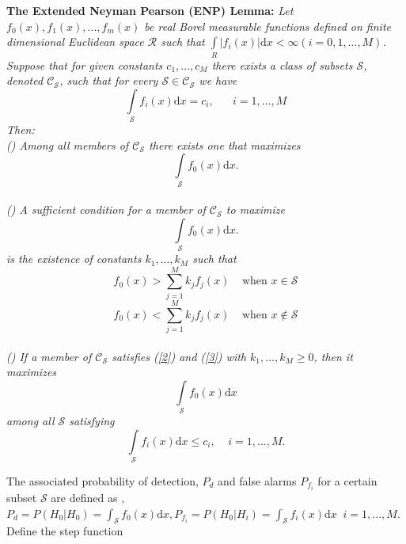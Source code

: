 \documentclass[12pt,journal,a4paper,twoside,onecolumn,draft]{IEEEtran}
\newcommand{\rmnum}[1]{\romannumeral #1}
\begin{document}
\begin{spacing}{2.5}
\noindent  \textbf{The Extended Neyman Pearson (ENP) Lemma:}
\textit{
Let $f_0(x), f_1(x), ..., f_{m}(x)$ be real Borel measurable functions  defined on finite dimensional  Euclidean space $\mathcal{R}$ such that $\int \limits_R | f_i(x)|\mathrm{d}x < \infty (i=0, 1,...,M)$.  Suppose that for given constants $c_1,...,c_M$ there exists a class of subsets $\mathcal{S}$, denoted $\mathcal{C}_\mathcal{S}$, such that for every $\mathcal{S} \in \mathcal{C}_\mathcal{S}$ we have
\begin{equation}
\label{one}
\int\limits_\mathcal{S} f_i(x)\mathrm{d}x = c_i, \;\;\;\;\;\;i=1,...,M
\end{equation}
Then:
\\\textnormal{(\rmnum{1})} Among all members of $\mathcal{C}_\mathcal{S}$ there exists one that maximizes
\[
\int \limits_\mathcal{S} f_{0}(x)\mathrm{d}x.
\]
\\\textnormal{(\rmnum{2})} A sufficient condition for a member of $\mathcal{C}_\mathcal{S}$ to maximize
\[
\int \limits_\mathcal{S} f_{0}(x)\mathrm{d}x.
\]
is the existence of constants $k_1,...,k_M$ such that
\begin{equation}
\label{2}
f_{0}(x)>\sum\limits_{j=1}^M k_j f_j(x)\;\;\;\;\text{when $x \in \mathcal{S}$}
\end{equation}
\begin{equation}
\label{3}
f_{0}(x)<\sum\limits_{j=1}^M k_j f_j(x)\;\;\;\;\text{when $x \notin \mathcal{S}$}
\end{equation}
\\\textnormal{(\rmnum{3})} If a member of $\mathcal{C}_\mathcal{S}$ satisfies  \textnormal{(\ref{2})} and \textnormal{(\ref{3})} with $k_1,...,k_M\geq0$, then it maximizes
\begin{equation}
\label{4}
\int \limits_\mathcal{S} f_{0}(x)\mathrm{d}x
\end{equation}
among all $\mathcal{S}$ satisfying
\begin{equation}
\label{5}
\int \limits_\mathcal{S} f_i(x)\mathrm{d}x\leq c_i,\;\;\;\;i=1,...,M.
\end{equation}
}

The associated probability of detection, $P_d$ and false alarms $P_{f_i}$ for a certain subset $\mathcal{S}$ are defined as \cite{neyman1933problem}, $P_d = P(H_0 | H_0) = \int_{\mathcal{S}}f_0(x)\mathrm{d}x, P_{f_i} = P(H_0 | H_i) = \int_{\mathcal{S}}f_i(x)\mathrm{d}x\;\; i = 1, ..., M $. Define the step function


\end{spacing}
\end{document}
